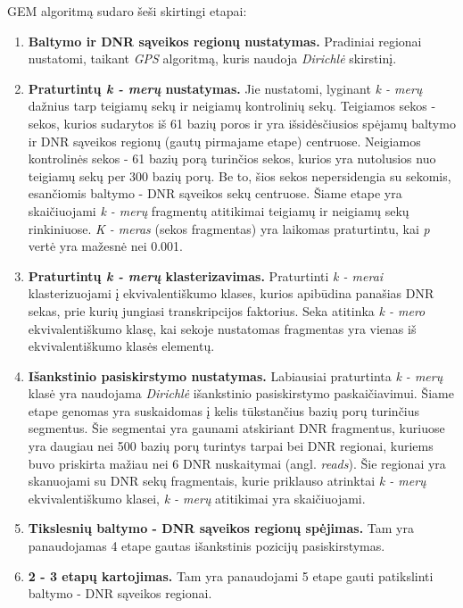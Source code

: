 \documentclass[12pt]{article}
\begin{document}
GEM algoritmą sudaro šeši skirtingi etapai\cite{ARTICLE15}:
\begin{enumerate}
    \item \textbf{Baltymo ir DNR sąveikos regionų nustatymas.} Pradiniai
        regionai nustatomi, taikant \emph{GPS} algoritmą\cite{ARTICLE14},
        kuris naudoja \emph{Dirichlė} skirstinį.
    \item \textbf{Praturtintų \emph{k - merų} nustatymas.} Jie nustatomi,
        lyginant \emph{k - merų} dažnius tarp teigiamų sekų ir neigiamų
        kontrolinių sekų. Teigiamos sekos - sekos, kurios sudarytos iš 61
        bazių poros ir yra išsidėsčiusios spėjamų baltymo ir DNR sąveikos
        regionų (gautų pirmajame etape) centruose. Neigiamos kontrolinės
        sekos - 61 bazių porą turinčios sekos, kurios yra nutolusios nuo
        teigiamų sekų per 300 bazių porų. Be to, šios sekos nepersidengia su
        sekomis, esančiomis baltymo - DNR sąveikos sekų centruose. Šiame
        etape yra skaičiuojami \emph{k - merų} fragmentų atitikimai teigiamų
        ir neigiamų sekų rinkiniuose. \emph{K - meras} (sekos fragmentas)
        yra laikomas praturtintu, kai \emph{p} vertė yra mažesnė nei 0.001.
    \item \textbf{Praturtintų \emph{k - merų} klasterizavimas.} Praturtinti
        \emph{k - merai} klasterizuojami į ekvivalentiškumo klases, kurios
        apibūdina panašias DNR sekas, prie kurių jungiasi transkripcijos
        faktorius. Seka atitinka \emph{k - mero} ekvivalentiškumo klasę, kai
        sekoje nustatomas fragmentas yra vienas iš ekvivalentiškumo klasės
        elementų.
    \item \textbf{Išankstinio pasiskirstymo nustatymas.} Labiausiai praturtinta
        \emph{k - merų} klasė yra naudojama \emph{Dirichlė} išankstinio
        pasiskirstymo paskaičiavimui. Šiame etape genomas yra suskaidomas į
        kelis tūkstančius bazių porų turinčius segmentus. Šie segmentai yra
        gaunami atskiriant DNR fragmentus, kuriuose yra daugiau nei 500 bazių
        porų turintys tarpai bei DNR regionai, kuriems buvo priskirta mažiau
        nei 6 DNR nuskaitymai (angl. \emph{reads}). Šie regionai yra
        skanuojami su DNR sekų fragmentais, kurie priklauso atrinktai
        \emph{k - merų} ekvivalentiškumo klasei, \emph{k - merų}
        atitikimai yra skaičiuojami.
    \item \textbf{Tikslesnių baltymo - DNR sąveikos regionų spėjimas.} Tam yra
        panaudojamas 4 etape gautas išankstinis pozicijų pasiskirstymas.
    \item \textbf{2 - 3 etapų kartojimas.} Tam yra panaudojami 5 etape gauti
        patikslinti baltymo - DNR sąveikos regionai.
\end{enumerate}
\end{document}
